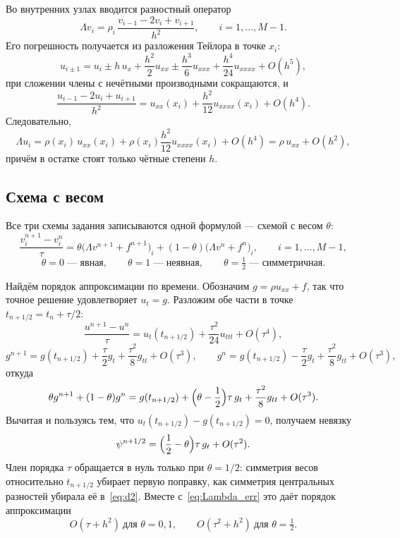\documentclass[12pt,a4paper]{article}
\begin{document}
Во внутренних узлах вводится разностный оператор
\begin{equation}\label{eq:Lambda}
\Lambda v_i=\rho_i\,\frac{v_{i-1}-2v_i+v_{i+1}}{h^2},\qquad i=1,\dots,M-1 .
\end{equation}
Его погрешность получается из разложения Тейлора в точке $x_i$:
\[
u_{i\pm1}=u_i\pm h\,u_x+\frac{h^2}{2}u_{xx}\pm\frac{h^3}{6}u_{xxx}
          +\frac{h^4}{24}u_{xxxx}+O(h^5),
\]
при сложении члены с нечётными производными сокращаются, и
\begin{equation}\label{eq:d2}
\frac{u_{i-1}-2u_i+u_{i+1}}{h^2}=u_{xx}(x_i)+\frac{h^2}{12}u_{xxxx}(x_i)
   +O(h^4).
\end{equation}
Следовательно,
\begin{equation}\label{eq:Lambda_err}
\Lambda u_i=\rho(x_i)\,u_{xx}(x_i)
   +\rho(x_i)\frac{h^2}{12}u_{xxxx}(x_i)+O(h^4)
 =\rho\,u_{xx}+O(h^2),
\end{equation}
причём в остатке стоят только чётные степени $h$.

\subsection{Схема с весом}

Все три схемы задания записываются одной формулой --- схемой с весом
$\theta$:
\begin{equation}\label{eq:theta}
\frac{v_i^{n+1}-v_i^n}{\tau}
=\theta\bigl(\Lambda v^{n+1}+f^{n+1}\bigr)_i
+(1-\theta)\bigl(\Lambda v^{n}+f^{n}\bigr)_i,
\qquad i=1,\dots,M-1,
\end{equation}
\[
\theta=0 \;\text{--- явная},\qquad
\theta=1 \;\text{--- неявная},\qquad
\theta=\tfrac12 \;\text{--- симметричная}.
\]

Найдём порядок аппроксимации по времени. Обозначим $g=\rho u_{xx}+f$,
так что точное решение удовлетворяет $u_t=g$. Разложим обе части
в точке $t_{n+1/2}=t_n+\tau/2$:
\[
\frac{u^{n+1}-u^{n}}{\tau}=u_t(t_{n+1/2})+\frac{\tau^2}{24}u_{ttt}+O(\tau^4),
\]
\[
g^{n+1}=g(t_{n+1/2})+\frac{\tau}{2}g_t+\frac{\tau^2}{8}g_{tt}+O(\tau^3),
\qquad
g^{n}=g(t_{n+1/2})-\frac{\tau}{2}g_t+\frac{\tau^2}{8}g_{tt}+O(\tau^3),
\]
откуда
\[
\theta g^{n+1}+(1-\theta)g^{n}
=g(t_{n+1/2})+\Bigl(\theta-\frac12\Bigr)\tau\,g_t
 +\frac{\tau^2}{8}g_{tt}+O(\tau^3).
\]
Вычитая и пользуясь тем, что $u_t(t_{n+1/2})-g(t_{n+1/2})=0$, получаем
невязку
\begin{equation}\label{eq:theta_err}
\psi^{n+1/2}=\Bigl(\frac12-\theta\Bigr)\tau\,g_t+O(\tau^2).
\end{equation}
Член порядка $\tau$ обращается в нуль только при $\theta=1/2$: симметрия
весов относительно $t_{n+1/2}$ убирает первую поправку, как симметрия
центральных разностей убирала её в~\eqref{eq:d2}. Вместе
с~\eqref{eq:Lambda_err} это даёт порядок аппроксимации
\begin{equation}\label{eq:orders}
O(\tau+h^2)\ \text{для } \theta=0,1,
\qquad
O(\tau^2+h^2)\ \text{для } \theta=\tfrac12 .
\end{equation}
\end{document}
